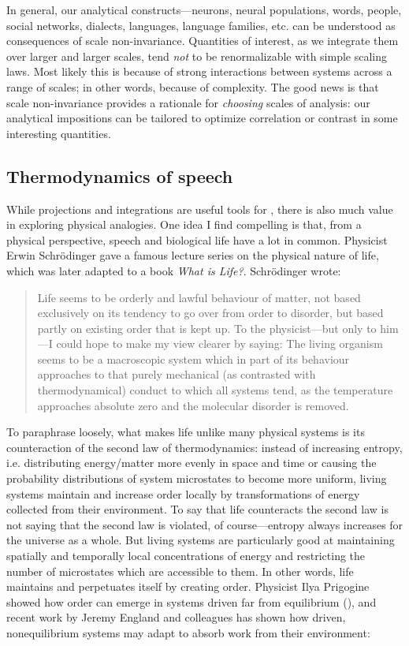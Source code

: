   In general, our analytical constructs—neurons, neural populations, words, people, social networks, dialects, languages, language families, etc. can be understood as consequences of scale non-invariance. Quantities of interest, as we integrate them over larger and larger scales, tend \textit{not} to be renormalizable with simple scaling laws. Most likely this is because of strong interactions between systems across a range of scales; in other words, because of complexity. The good news is that scale non-invariance provides a rationale for \textit{choosing} scales of analysis: our analytical impositions can be tailored to optimize correlation or contrast in some interesting quantities.

\subsection{Thermodynamics of speech}

While projections and integrations are useful tools for , there is also much value in exploring physical analogies. One idea I find compelling is that, from a physical perspective, speech and biological life have a lot in common. Physicist Erwin Schrödinger gave a famous lecture series on the physical nature of life, which was later adapted to a book \textit{What is Life?}. Schrödinger wrote:

\begin{quote}
Life seems to be orderly and lawful behaviour of matter, not based exclusively on its tendency to go over from order to disorder, but based partly on existing order that is kept up. To the physicist—but only to him—I could hope to make my view clearer by saying: The living organism seems to be a macroscopic system which in part of its behaviour approaches to that purely mechanical (as contrasted with thermodynamical) conduct to which all systems tend, as the temperature approaches absolute zero and the molecular disorder is removed. \citep{Schrödinger1944}
\end{quote}

  To paraphrase loosely, what makes life unlike many physical systems is its counteraction of the second law of thermodynamics: instead of increasing entropy, i.e. distributing energy/matter more evenly in space and time or causing the probability distributions of system microstates to become more uniform, living systems maintain and increase order locally by transformations of energy collected from their environment. To say that life counteracts the second law is not saying that the second law is violated, of course—entropy always increases for the universe as a whole. But living systems are particularly good at maintaining spatially and temporally local concentrations of energy and restricting the number of microstates which are accessible to them. In other words, life maintains and perpetuates itself by creating order. Physicist Ilya Prigogine showed how order can emerge in systems driven far from equilibrium (\citealt{KondepudiPrigogine1998,NicolisPrigogine1977,PrigogineStengers1984}), and recent work by Jeremy England and colleagues has shown how driven, nonequilibrium systems may adapt to absorb work from their environment:

